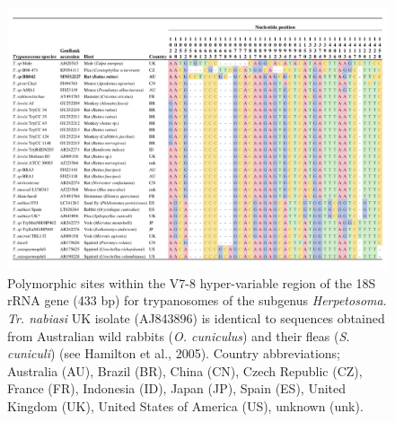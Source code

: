 \documentclass[a4paper, nobind]{templates/ociamthesis}
\begin{document}
\begin{figure}
\includegraphics[width=0.95\linewidth]{figures/ms-figs/Ch5-Fig2} \caption[Nucleotide alignment of \textit{Trypanosoma lewisi} clade.]{Polymorphic sites within the V7-8 hyper-variable region of the 18S rRNA gene (433 bp) for trypanosomes of the subgenus \textit{Herpetosoma}. \textit{Tr. nabiasi} UK isolate (AJ843896) is identical to sequences obtained from Australian wild rabbits (\textit{O. cuniculus}) and their fleas (\textit{S. cuniculi}) (see Hamilton et al., 2005). Country abbreviations; Australia (AU), Brazil (BR), China (CN), Czech Republic (CZ), France (FR), Indonesia (ID), Japan (JP), Spain (ES), United Kingdom (UK), United States of America (US), unknown (unk).}\label{fig:F52}
\end{figure}
\end{document}
